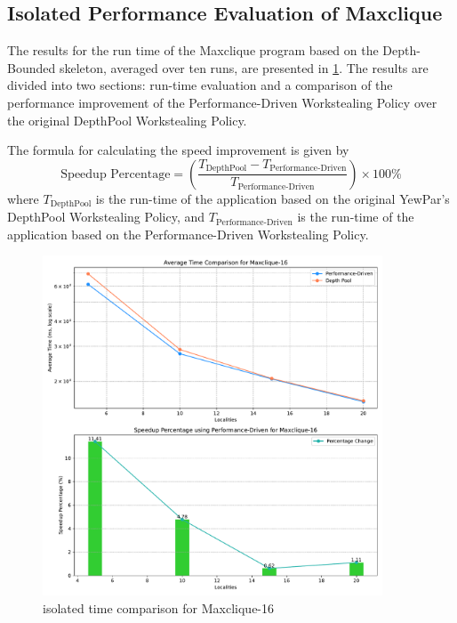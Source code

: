 \documentclass{mproj}
\begin{document}
\subsection{Isolated Performance Evaluation of Maxclique}

The results for the run time of the Maxclique program based on the Depth-Bounded skeleton, averaged over ten runs, are presented in \cref{fig:time_comparison_max_solo}.
The results are divided into two sections: run-time evaluation and a comparison of the performance improvement of the Performance-Driven Workstealing Policy over the original DepthPool Workstealing Policy.

The formula for calculating the speed improvement is given by
\begin{equation}
    \text{Speedup Percentage} = \left( \frac{T_{\text{DepthPool}} - T_{\text{Performance-Driven}}}{T_{\text{Performance-Driven}}} \right) \times 100\%
\end{equation}
where \( T_{\text{DepthPool}} \) is the run-time of the application based on the original YewPar's DepthPool Workstealing Policy,
and \( T_{\text{Performance-Driven}} \) is the run-time of the application based on the Performance-Driven Workstealing Policy.

\begin{figure}[h]
    \centering %
    \includegraphics[width=0.9\textwidth]{images/time_comparison_max_solo.pdf} %
    \caption{isolated time comparison for Maxclique-16} %
    \label{fig:time_comparison_max_solo} %
\end{figure}
\FloatBarrier
\end{document}
